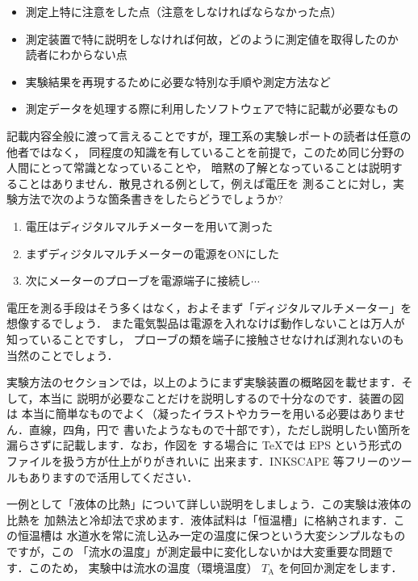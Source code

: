 \documentclass[a4paper,10pt]{jsarticle}
\def\rm#1{\mathrm{#1}}
\begin{document}
%
\begin{itemize}
\setlength{\itemsep}{-2mm}
 \item 測定上特に注意をした点（注意をしなければならなかった点）
 \item 測定装置で特に説明をしなければ何故，どのように測定値を取得したのか
 	  読者にわからない点
 \item 実験結果を再現するために必要な特別な手順や測定方法など
 \item 測定データを処理する際に利用したソフトウェアで特に記載が必要なもの
\end{itemize}

記載内容全般に渡って言えることですが，理工系の実験レポートの読者は任意の他者ではなく，
同程度の知識を有していることを前提で，このため同じ分野の人間にとって常識となっていることや，
暗黙の了解となっていることは説明することはありません．散見される例として，例えば電圧を
測ることに対し，実験方法で次のような箇条書きをしたらどうでしょうか?
%
\begin{enumerate}
\setlength{\itemsep}{-2mm}
 \item 電圧はディジタルマルチメーターを用いて測った
 \item まずディジタルマルチメーターの電源をONにした
 \item 次にメーターのプローブを電源端子に接続し$\cdots$
\end{enumerate}

電圧を測る手段はそう多くはなく，およそまず「ディジタルマルチメーター」を想像するでしょう．
また電気製品は電源を入れなけば動作しないことは万人が知っていることですし，
プローブの類を端子に接触させなければ測れないのも当然のことでしょう．

実験方法のセクションでは，以上のようにまず実験装置の概略図を載せます．そして，本当に
説明が必要なことだけを説明しするので十分なのです．装置の図は
本当に簡単なものでよく（凝ったイラストやカラーを用いる必要はありません．直線，四角，円で
書いたようなもので十部です），ただし説明したい箇所を漏らさずに記載します．なお，作図を
する場合に \TeX では EPS という形式のファイルを扱う方が仕上がりがきれいに
出来ます．INKSCAPE 等フリーのツールもありますので活用してください．

\vspace{3mm}
一例として「液体の比熱」について詳しい説明をしましょう．この実験は液体の比熱を
加熱法と冷却法で求めます．液体試料は「恒温槽」に格納されます．この恒温槽は
水道水を常に流し込み一定の温度に保つという大変シンプルなものですが，この
「流水の温度」が測定最中に変化しないかは大変重要な問題です．このため，
実験中は流水の温度（環境温度） $T_\rm{A}$ を何回か測定をします．
\end{document}
